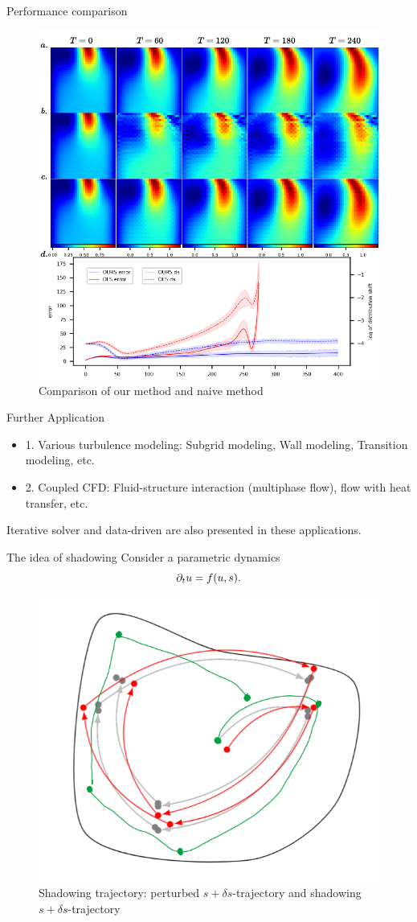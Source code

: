 \documentclass[NUS-Kajima workshop]{beamer}
\begin{document}
\begin{frame}{Performance comparison}
	\begin{figure}[H]
          \centering
          \centerline{\includegraphics[width=.7\linewidth]{fig/NS-TR.pdf}}
          \caption{Comparison of our method and naive method}
\end{figure}
\end{frame}

\begin{frame}{Further Application}
	\begin{itemize}
		\item 1. Various turbulence modeling: Subgrid modeling, Wall modeling, Transition modeling, etc.
		\item 2. Coupled CFD: Fluid-structure interaction (multiphase flow), flow with heat transfer, etc.
	\end{itemize}
	Iterative solver and data-driven are also presented in these applications.
\end{frame}

\begin{frame}{The idea of shadowing}
	Consider a parametric dynamics
	\begin{equation}
		\partial_t u = f(u, s).
	\end{equation}
	\begin{figure}[H]
          \centering
          \centerline{\includegraphics[width=.6\linewidth]{fig/shadowing.png}}
          \caption{Shadowing trajectory: {\color{green} perturbed $s+\delta s$-trajectory} and {\color{red} shadowing $s+\delta s$-trajectory}}
\end{figure}
\end{frame}
\end{document}
